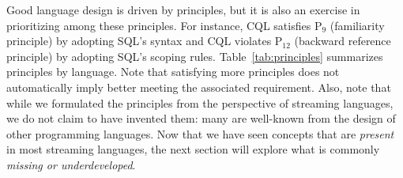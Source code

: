 Good language design is driven by principles, but it is also an
exercise in prioritizing among these principles. For instance, CQL
satisfies P$_9$ (familiarity principle) by adopting SQL's syntax and
CQL violates P$_{12}$ (backward reference principle) by adopting SQL's
scoping rules. Table~\ref{tab:principles} summarizes principles by
language. Note that satisfying more principles does not automatically
imply better meeting the associated requirement. Also, note that while
we formulated the principles from the perspective of streaming
languages, we do not claim to have invented them: many are well-known
from the design of other programming languages. Now that we have seen
concepts that are \emph{present} in most streaming languages, the next
section will explore what is commonly \emph{missing or
  underdeveloped}.
